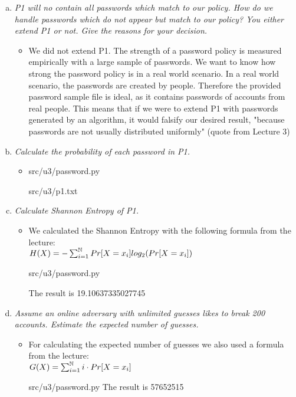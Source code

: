 \begin{enumerate}[(a)]
    \item {\itshape P1 will  no  contain  all  passwords  which  match  to  our  policy.  How  do  we  handle passwords which do not appear but match to our policy? You either extend P1 or not. Give the reasons for your decision.}
    \begin{itemize}
        \item We did not extend P1. The strength of a password policy is measured empirically with a large sample of passwords. We want to know how strong the password policy is in a real world scenario. In a real world scenario, the passwords are created by people. Therefore the provided password sample file is ideal, as it contains passwords of accounts from real people. This means that if we were to extend P1 with passwords generated by an algorithm, it would falsify our desired result, "because passwords are not usually distributed uniformly" (quote from Lecture 3)
    \end{itemize}
    
    
    \item {\itshape Calculate the probability of each password in P1.}
    \begin{itemize}
        \item 
            {src/u3/password.py}
            
            {src/u3/p1.txt}
    \end{itemize}
    
    \item {\itshape Calculate Shannon Entropy of P1.}
    \begin{itemize}
    \item We calculated the Shannon Entropy with the following formula from the lecture:
        \\{\Large $H(X) = - \sum_{i=1}^\mathbb{N} Pr[X = x_i] log_2 (Pr[X = x_i]) $}
        
            {src/u3/password.py}
    
    The result is 19.10637335027745
    \end{itemize}   
    
    \item {\itshape Assume  an  online  adversary  with  unlimited  guesses  likes  to  break  200  accounts. Estimate the expected number of guesses.}
    \begin{itemize}
        \item For calculating the expected number of guesses we also used a formula from the lecture:
            \\{\Large $G(X) = \sum_{i=1}^\mathbb{N} i \cdot Pr[X = x_i] $}
            
                {src/u3/password.py}
            The result is 57652515
    \end{itemize}
    

\end{enumerate}
